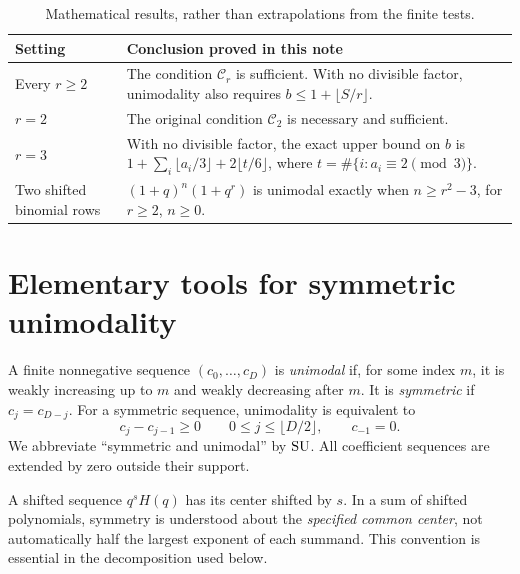 \documentclass[11pt]{article}
\theoremstyle{research}
\theoremstyle{definition}
\newcommand{\SU}{\textup{SU}}
\numberwithin{equation}{section}
\begin{document}
\begin{table}[htbp]
\centering
\small
\begin{tabular}{@{}p{.25\linewidth}p{.64\linewidth}@{}}
\toprule
Setting & Conclusion proved in this note \\
\midrule
Every $r\ge2$ & The condition $\mathcal C_r$ is sufficient. With no divisible
factor, unimodality also requires $b\le1+\lfloor S/r\rfloor$. \\
$r=2$ & The original condition $\mathcal C_2$ is necessary and sufficient. \\
$r=3$ & With no divisible factor, the exact upper bound on $b$ is
$1+\sum_i\lfloor a_i/3\rfloor+2\lfloor t/6\rfloor$,
where $t=\#\{i:a_i\equiv2\pmod3\}$. \\
Two shifted binomial rows & $(1+q)^n(1+q^r)$ is unimodal exactly when
$n\ge r^2-3$, for $r\ge2$, $n\ge0$. \\
\bottomrule
\end{tabular}
\caption{Mathematical results, rather than extrapolations from the finite tests.}
\label{tab:results}
\end{table}

\section{Elementary tools for symmetric unimodality}
\label{sec:tools}
A finite nonnegative sequence $(c_0,\ldots,c_D)$ is \emph{unimodal} if,
for some index $m$, it is weakly increasing up to $m$ and weakly decreasing
after $m$. It is \emph{symmetric} if $c_j=c_{D-j}$.
For a symmetric sequence, unimodality is equivalent to
\begin{equation}\label{eq:firsthalf}
 c_j-c_{j-1}\ge0\qquad
 0\le j\le\lfloor D/2\rfloor,
 \qquad c_{-1}=0.
\end{equation}
We abbreviate ``symmetric and unimodal'' by $\SU$.
All coefficient sequences are extended by zero outside their support.

A shifted sequence $q^sH(q)$ has its center shifted by $s$.
In a sum of shifted polynomials, symmetry is understood about the
\emph{specified common center}, not automatically half the largest
exponent of each summand. This convention is essential in the decomposition
used below.
\end{document}
